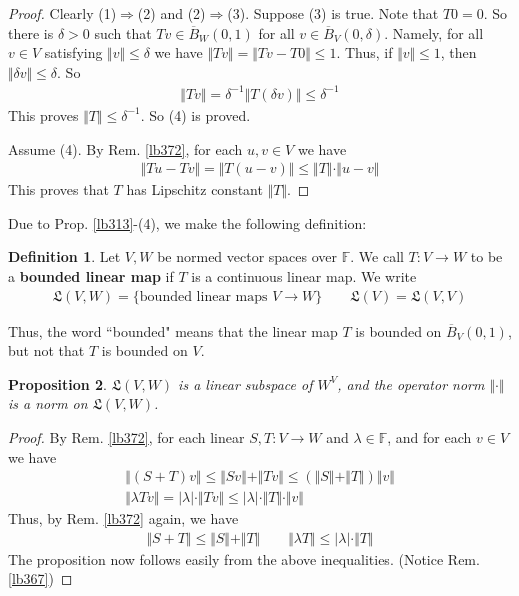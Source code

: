 \documentclass[12pt,b5paper,notitlepage]{article}
\theoremstyle{definition}
\newtheorem{df}{Definition}[section]
\theoremstyle{plain}
\newtheorem{pp}[df]{Proposition}
\newcommand{\fk}{\mathfrak}
\newcommand{\ovl}{\overline}
\newcommand{\Fbb}{\mathbb F}
\numberwithin{equation}{section}
\begin{document}
\begin{proof}
Clearly (1)$\Rightarrow$(2) and (2)$\Rightarrow$(3). Suppose (3) is true. Note that $T0=0$. So there is $\delta>0$ such that $Tv\in \ovl B_W(0,1)$ for all $v\in \ovl B_V(0,\delta)$. Namely, for all $v\in V$ satisfying $\Vert v\Vert\leq \delta$ we have $\Vert Tv\Vert=\Vert Tv-T0\Vert\leq 1$. Thus, if $\Vert v\Vert\leq 1$, then $\Vert \delta v\Vert\leq\delta$. So
\begin{align*}
\Vert Tv\Vert=\delta^{-1}\Vert T(\delta v)\Vert\leq \delta^{-1}
\end{align*}
This proves $\Vert T\Vert\leq\delta^{-1}$. So (4) is proved.

Assume (4). By Rem. \ref{lb372}, for each $u,v\in V$ we have
\begin{align*}
\Vert Tu-Tv\Vert=\Vert T(u-v)\Vert\leq \Vert T\Vert\cdot \Vert u-v\Vert
\end{align*}
This proves that $T$ has Lipschitz constant $\Vert T\Vert$.
\end{proof}





Due to Prop. \ref{lb313}-(4), we make the following definition:
\begin{df}
Let $V,W$ be normed vector spaces over $\Fbb$. We call $T:V\rightarrow W$ to be a \textbf{bounded linear map}  if $T$ is a continuous linear map. We write \index{LVW@$\fk L(V,W),\fk L(V)$}
\begin{align}
\fk L(V,W)=\{\text{bounded linear maps }V\rightarrow W\}\qquad \fk L(V)=\fk L(V,V)
\end{align}
\end{df}

Thus, the word ``bounded" means that the linear map $T$ is bounded on $\ovl B_V(0,1)$, but not that $T$ is bounded on $V$.

\begin{pp}\label{lb314}
$\fk L(V,W)$ is a linear subspace of $W^V$, and the operator norm $\Vert \cdot\Vert$ is a norm on $\fk L(V,W)$.
\end{pp}

\begin{proof}
By Rem. \ref{lb372}, for each linear $S,T:V\rightarrow W$ and $\lambda\in\Fbb$, and for each $v\in V$ we have
\begin{gather*}
\Vert (S+T)v\Vert\leq \Vert S v\Vert+\Vert Tv\Vert\leq(\Vert S\Vert+\Vert T\Vert)\Vert v\Vert\\
\Vert \lambda Tv\Vert=|\lambda|\cdot\Vert Tv\Vert\leq |\lambda|\cdot \Vert T\Vert \cdot\Vert v\Vert
\end{gather*}
Thus, by Rem. \ref{lb372} again, we have
\begin{align}
\Vert S+T\Vert\leq \Vert S\Vert+\Vert T\Vert\qquad \Vert\lambda T\Vert\leq |\lambda|\cdot \Vert T\Vert
\end{align}
The proposition now follows easily from the above inequalities. (Notice Rem. \ref{lb367})
\end{proof}
\end{document}
